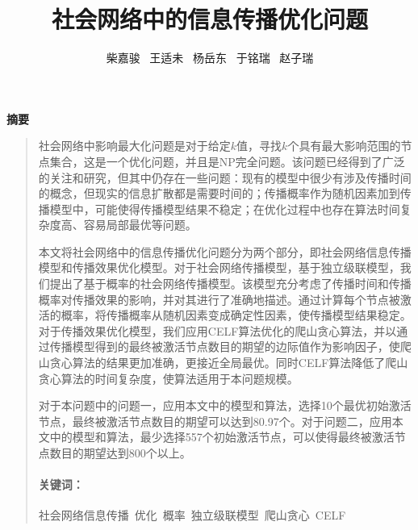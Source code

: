 \documentclass[UTF8]{ctexart}
\title{社会网络中的信息传播优化问题}
\author{柴嘉骏 \, 王适未 \, 杨岳东 \, 于铭瑞 \, 赵子瑞}
\newcommand{\xiaosi}{\fontsize{12.1pt}{\baselineskip}\selectfont}
\newcommand{\sihao}{\fontsize{14.1pt}{\baselineskip}\selectfont}
\begin{document}
\maketitle

\newenvironment{cnabandkey}[2][\sihao 摘要] %
{\newcommand{\ckeywords}{#2} %
	\begin{center} \bfseries #1 \end{center} %
	\begin{quotation}
	}{\paragraph{\sihao 关键词：} \textrm{\ckeywords} %
	\end{quotation}
}


\newenvironment{enabandkey}[2][\sihao Abstract] %
{\newcommand{\ekeywords}{#2} %
	\begin{center} \bfseries #1 \end{center} %
	\begin{quotation}
	}{\paragraph{\sihao Keywords：} \textrm{\ekeywords} %
	\end{quotation}
}

	\begin{cnabandkey}{社会网络信息传播\, 优化\, 概率\, 独立级联模型\, 爬山贪心\, CELF}
		\xiaosi
		社会网络中影响最大化问题是对于给定$k$值，寻找$k$个具有最大影响范围的节点集合，这是一个优化问题，并且是NP完全问题。该问题已经得到了广泛的关注和研究，但其中仍存在一些问题：现有的模型中很少有涉及传播时间的概念，但现实的信息扩散都是需要时间的；传播概率作为随机因素加到传播模型中，可能使得传播模型结果不稳定；在优化过程中也存在算法时间复杂度高、容易局部最优等问题。
		
		本文将社会网络中的信息传播优化问题分为两个部分，即社会网络信息传播模型和传播效果优化模型。对于社会网络传播模型，基于独立级联模型，我们提出了基于概率的社会网络传播模型。该模型充分考虑了传播时间和传播概率对传播效果的影响，并对其进行了准确地描述。通过计算每个节点被激活的概率，将传播概率从随机因素变成确定性因素，使传播模型结果稳定。对于传播效果优化模型，我们应用CELF算法优化的爬山贪心算法，并以通过传播模型得到的最终被激活节点数目的期望的边际值作为影响因子，使爬山贪心算法的结果更加准确，更接近全局最优。同时CELF算法降低了爬山贪心算法的时间复杂度，使算法适用于本问题规模。
		
		对于本问题中的问题一，应用本文中的模型和算法，选择10个最优初始激活节点，最终被激活节点数目的期望可以达到80.97个。对于问题二，应用本文中的模型和算法，最少选择557个初始激活节点，可以使得最终被激活节点数目的期望达到800个以上。
		
		
		
	\end{cnabandkey}
	
\end{document}
